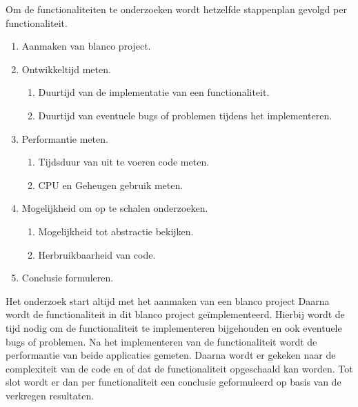 Om de functionaliteiten te onderzoeken wordt hetzelfde stappenplan gevolgd per functionaliteit. 
\begin{enumerate}
    \item Aanmaken van blanco project.
    \item Ontwikkeltijd meten.
    \begin{enumerate}
        \item Duurtijd van de implementatie van een functionaliteit.
        \item Duurtijd van eventuele bugs of problemen tijdens het implementeren.
    \end{enumerate}
    \item Performantie meten.
    \begin{enumerate}
        \item Tijdsduur van uit te voeren code meten.
        \item CPU en Geheugen gebruik meten.
    \end{enumerate}
    \item Mogelijkheid om op te schalen onderzoeken.
    \begin{enumerate}
        \item Mogelijkheid tot abstractie bekijken.
        \item Herbruikbaarheid van code.
    \end{enumerate}
    \item Conclusie formuleren.
\end{enumerate}
Het onderzoek start altijd met het aanmaken van een blanco project 
Daarna wordt de functionaliteit in dit blanco project geïmplementeerd. 
Hierbij wordt de tijd nodig om de functionaliteit te implementeren 
bijgehouden en ook eventuele bugs of problemen. Na het implementeren van de 
functionaliteit wordt de performantie van beide applicaties gemeten. 
Daarna wordt er gekeken naar de complexiteit van de code en of dat de functionaliteit 
opgeschaald kan worden. Tot slot wordt er dan per functionaliteit een conclusie 
geformuleerd op basis van de verkregen resultaten.
